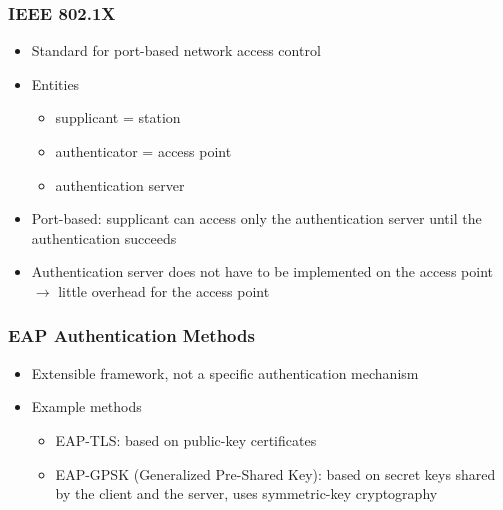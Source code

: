 \documentclass[final]{article}
\begin{document}
\subsubsection*{IEEE 802.1X}
\begin{itemize}[nosep]
    \item Standard for port-based network access control
    \item Entities
          \begin{itemize}[nosep]
              \item supplicant = station
              \item authenticator = access point
              \item authentication server
          \end{itemize}
    \item Port-based: supplicant can access only the authentication server until the authentication succeeds
    \item Authentication server does not have to be implemented on the access point $\rightarrow$ little overhead for the access point
\end{itemize}
\subsubsection*{EAP Authentication Methods}
\begin{itemize}[nosep]
    \item Extensible framework, not a specific authentication mechanism
    \item Example methods
          \begin{itemize}[nosep]
              \item EAP-TLS: based on public-key certificates
              \item EAP-GPSK (Generalized Pre-Shared Key): based on secret keys shared by the client and the server, uses symmetric-key cryptography
          \end{itemize}
\end{itemize}
\end{document}
